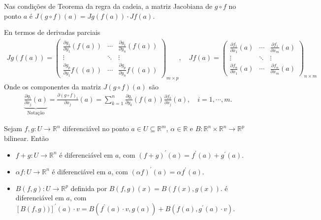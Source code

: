 \begin{corollary}
  Nas condições de Teorema da regra da cadeia, a matriz Jacobiana de $g\circ f$ no ponto $a$ é $J(g\circ f)(a)=Jg(f(a))\cdot Jf(a)$.

  En termos de derivadas parciais
  \begin{align*}
    Jg(f(a))=\begin{pmatrix}
      \frac{\partial g_1}{\partial y_1}(f(a)) & \cdots & \frac{\partial g_1}{\partial y_n}(f(a))\\
      \vdots & \ddots & \vdots\\
      \frac{\partial g_p}{\partial y_1}f((a)) & \cdots & \frac{\partial g_p}{\partial y_n}f((a))
    \end{pmatrix}_{m\times p},\quad Jf(a)=\begin{pmatrix}
      \frac{\partial f_1}{\partial x_1}(a) & \cdots & \frac{\partial f_1}{\partial x_m}(a)\\
      \vdots & \ddots & \vdots\\
      \frac{\partial f_n}{\partial x_1}(a) & \cdots & \frac{\partial f_n}{\partial x_m}(a)
    \end{pmatrix}_{n\times m}
  \end{align*}
  Onde os componentes da matriz $J(g\circ f)(a)$ são
  \begin{align*}
    \underbrace{\frac{\partial g_i}{\partial x_j}(a)}_{\text{Notação}}=\frac{\partial (g\circ f)_i}{\partial x_j}(a)=\sum_{k=1}^{n}\frac{\partial g_i}{\partial y_k}(f(a))\frac{\partial f_k}{\partial x_j}(a),\quad i=1,\cdots,m.
  \end{align*}
\end{corollary}
\begin{corollary}
  Sejam $f,g:U\to\mathbb{R}^{n}$ diferenciável no ponto $a\in U\subseteq \mathbb{R}^{m}$, $\alpha\in\mathbb{R}$ e $B:\mathbb{R}^{n}\times\mathbb{R}^{n}\to\mathbb{R}^{p}$ bilinear. Então
  \begin{itemize}
    \item $f+g:U\to\mathbb{R}^{n}$ é diferenciável em $a$, com $(f+g)^{\prime}(a)=f^{\prime}(a)+g^{\prime}(a)$.
    \item $\alpha f:U\to\mathbb{R}^{n}$ é diferenciável em $a$, com $(\alpha f)^{\prime}(a)=\alpha f^{\prime}(a)$.
    \item $B(f,g):U\to\mathbb{R}^{p}$ definida por $B(f,g)(x)=B(f(x),g(x))$.
      é diferenciável em $a$, com $\left[B(f,g))\right]^{\prime}(a)\cdot v= B\left( f^{\prime}(a)\cdot v,g(a) \right)+B\left( f(a),g^{\prime}(a)\cdot v \right)$.
  \end{itemize}
\end{corollary}
